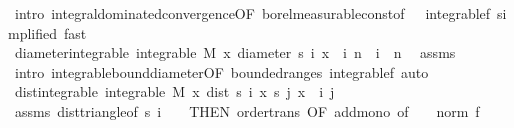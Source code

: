 \begin{isabellebody}
\ {\isacharparenleft}{\kern0pt}intro\ integral{\isacharunderscore}{\kern0pt}dominated{\isacharunderscore}{\kern0pt}convergence{\isacharbrackleft}{\kern0pt}OF\ borel{\isacharunderscore}{\kern0pt}measurable{\isacharunderscore}{\kern0pt}const{\isacharbrackleft}{\kern0pt}of\ {}{\isacharbrackright}{\kern0pt}\ {\isacharunderscore}{\kern0pt}\ integrable{\isacharunderscore}{\kern0pt}{}f{\isacharcomma}{\kern0pt}\ simplified{\isacharbrackright}{\kern0pt}{\isacharparenright}{\kern0pt}\ {\isacharparenleft}{\kern0pt}fast{\isacharplus}{\kern0pt}{\isacharparenright}{\kern0pt}\isanewline
\ \ \isanewline
\ \ \isamarkupfalse%
\ diameter{\isacharunderscore}{\kern0pt}integrable{\isacharcolon}{\kern0pt}\ {\isachardoublequoteopen}integrable\ M\ {\isacharparenleft}{\kern0pt}{\isasymlambda}x{\isachardot}{\kern0pt}\ diameter\ {\isacharbraceleft}{\kern0pt}s\ i\ x\ {\isacharbar}{\kern0pt}\ i{\isachardot}{\kern0pt}\ n\ {\isasymle}\ i{\isacharbraceright}{\kern0pt}{\isacharparenright}{\kern0pt}{\isachardoublequoteclose}\ \ n\ \isamarkupfalse%
\ assms{\isacharparenleft}{\kern0pt}{}{\isacharcomma}{\kern0pt}{}{\isacharparenright}{\kern0pt}\ \isanewline
\ \ \ \ \isamarkupfalse%
\ {\isacharparenleft}{\kern0pt}intro\ integrable{\isacharunderscore}{\kern0pt}bound{\isacharunderscore}{\kern0pt}diameter{\isacharbrackleft}{\kern0pt}OF\ bounded{\isacharunderscore}{\kern0pt}range{\isacharunderscore}{\kern0pt}s\ integrable{\isacharunderscore}{\kern0pt}{}f{\isacharbrackright}{\kern0pt}{\isacharcomma}{\kern0pt}\ auto{\isacharparenright}{\kern0pt}\isanewline
\isanewline
\ \ \isamarkupfalse%
\ dist{\isacharunderscore}{\kern0pt}integrable{\isacharcolon}{\kern0pt}\ {\isachardoublequoteopen}integrable\ M\ {\isacharparenleft}{\kern0pt}{\isasymlambda}x{\isachardot}{\kern0pt}\ dist\ {\isacharparenleft}{\kern0pt}s\ i\ x{\isacharparenright}{\kern0pt}\ {\isacharparenleft}{\kern0pt}s\ j\ x{\isacharparenright}{\kern0pt}{\isacharparenright}{\kern0pt}{\isachardoublequoteclose}\ \ i\ j\ \ \isamarkupfalse%
\ assms{\isacharparenleft}{\kern0pt}{}{\isacharparenright}{\kern0pt}\ dist{\isacharunderscore}{\kern0pt}triangle{}{\isacharbrackleft}{\kern0pt}of\ {\isachardoublequoteopen}s\ i\ {\isacharunderscore}{\kern0pt}{\isachardoublequoteclose}\ {\isacharunderscore}{\kern0pt}\ {}{\isacharcomma}{\kern0pt}\ THEN\ order{\isacharunderscore}{\kern0pt}trans{\isacharcomma}{\kern0pt}\ OF\ add{\isacharunderscore}{\kern0pt}mono{\isacharcomma}{\kern0pt}\ of\ {\isacharunderscore}{\kern0pt}\ {\isachardoublequoteopen}{}\ {\isacharasterisk}{\kern0pt}\ norm\ {\isacharparenleft}{\kern0pt}f\ {\isacharunderscore}{\kern0pt}{\isacharparenright}{\kern0pt}{\isachardoublequoteclose}{\isacharbrackright}{\kern0pt}\isanewline

\end{isabellebody}
